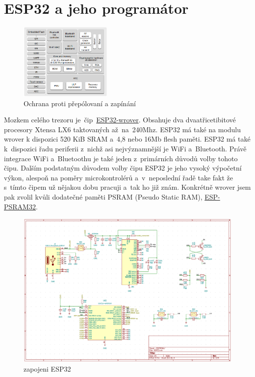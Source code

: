 \section{ESP32 a jeho programátor}


\begin{figure}
    \centering
    \includegraphics[width=0.4\textwidth]{kapitoly/obrazky/E4/ESP32/BlockDiagram.png}
    \caption{\label{fig:frog1}Ochrana proti přepólovaní a zapínání}
\end{figure}

Mozkem celého trezoru je~čip~\href{https://www.espressif.com/sites/default/files/documentation/esp32-wrover-b_datasheet_en.pdf}{ESP32-wrover}. 
Obsahuje dva dvaatřicetibitové procesory Xtensa LX6 taktovaných až~na~240Mhz. ESP32 má také na modulu wrover k dispozici 520 KiB SRAM 
a~4,8 nebo 16Mb flesh paměti. ESP32 má také k~dispozici řadu periferii z~nichž asi nejvýznamnější je WiFi a~Bluetooth. Právě integrace 
WiFi a~Bluetoothu je také jeden z~primárních důvodů volby tohoto čipu. Dalším podstatným důvodem volby čipu ESP32 je jeho vysoký výpočetní výkon, 
alespoň na poměry microkontrolérů a~v~neposlední řadě take fakt že s~tímto čipem už nějakou dobu pracuji a~tak ho již znám. Konkrétně wrover 
jsem pak zvolil kvůli dodatečné paměti PSRAM (Pseudo Static RAM), \href{http://gamma.spb.ru/images/pdf/esp-psram32_datasheet_en.pdf}{ESP-PSRAM32}.

\begin{figure}[htbp]
    \centering
    \includegraphics[width=\textwidth]{kapitoly/obrazky/E4/ESP32/sch.png}
    \caption{zapojeni ESP32}
    \label{fig:E4-step-up}
\end{figure}

